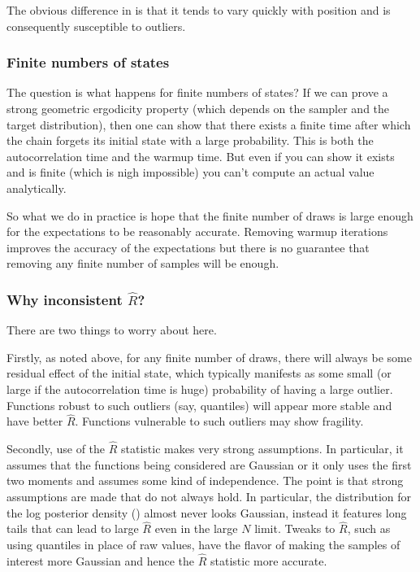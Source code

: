 The obvious difference in  is that it tends to vary
quickly with position and is consequently susceptible to outliers. 

\subsubsection{Finite numbers of states}

The question is what happens for finite numbers of states? If we can
prove a strong geometric ergodicity property (which depends on the
sampler and the target distribution), then one can show that there
exists a finite time after which the chain forgets its initial state
with a large probability. This is both the autocorrelation time and
the warmup time.  But even if you can show it exists and is finite
(which is nigh impossible) you can't compute an actual value
analytically.

So what we do in practice is hope that the finite number of draws is
large enough for the expectations to be reasonably accurate. Removing
warmup iterations improves the accuracy of the expectations but there
is no guarantee that removing any finite number of samples will be
enough.

\subsubsection{Why inconsistent $\hat{R}$?}

There are two things to worry about here.

Firstly, as noted above, for any finite number of draws, there will
always be some residual effect of the initial state, which typically
manifests as some small (or large if the autocorrelation time is huge)
probability of having a large outlier. Functions robust to such
outliers (say, quantiles) will appear more stable and have better
$\hat{R}$. Functions vulnerable to such outliers may show fragility.

Secondly, use of the $\hat{R}$ statistic makes very strong
assumptions. In particular, it assumes that the functions being
considered are Gaussian or it only uses the first two moments and
assumes some kind of independence.  The point is that strong
assumptions are made that do not always hold. In particular, the
distribution for the log posterior density () almost
never looks Gaussian, instead it features long tails that can lead to
large $\hat{R}$ even in the large $N$ limit.  Tweaks to $\hat{R}$,
such as using quantiles in place of raw values, have the flavor of
making the samples of interest more Gaussian and hence the $\hat{R}$
statistic more accurate.

